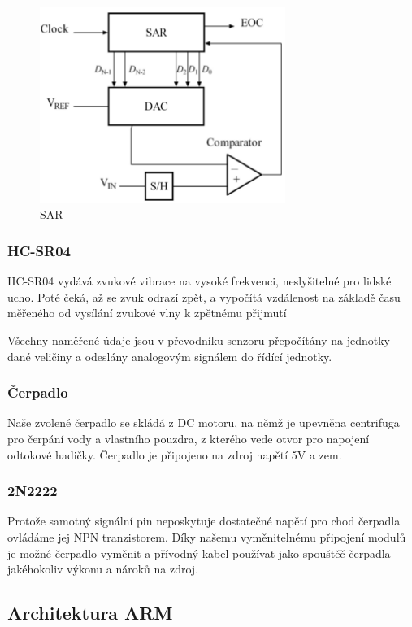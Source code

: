 \documentclass[12pt,a4paper]{article}
\begin{document}
\begin{figure}[h]
	\centering
	\includegraphics[width=8cm]{sar_adc.png}
	\caption{SAR}
\end{figure}

\subsubsection{HC-SR04}

HC-SR04 vydává zvukové vibrace na vysoké frekvenci, neslyšitelné pro lidské
ucho. Poté čeká, až se zvuk odrazí zpět, a vypočítá vzdálenost na základě času
měřeného od vysílání zvukové vlny k zpětnému přijmutí

Všechny naměřené údaje jsou v převodníku senzoru přepočítány na jednotky dané
veličiny a odeslány analogovým signálem do řídící jednotky.

\subsubsection{Čerpadlo}

Naše zvolené čerpadlo se skládá z DC motoru, na němž je upevněna centrifuga pro
čerpání vody a vlastního pouzdra, z kterého vede otvor pro napojení odtokové
hadičky. Čerpadlo je připojeno na zdroj napětí 5V a zem.

\subsubsection{2N2222}

Protože samotný signální pin neposkytuje dostatečné napětí pro chod čerpadla
ovládáme jej NPN tranzistorem. Díky našemu vyměnitelnému připojení modulů je
možné čerpadlo vyměnit a přívodný kabel používat jako spouštěč čerpadla
jakéhokoliv výkonu a nároků na zdroj.

\clearpage

\subsection{Architektura ARM}
\end{document}
